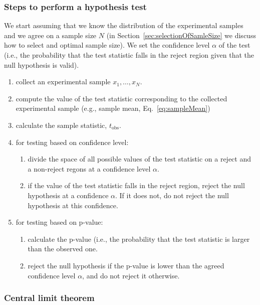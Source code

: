 \documentclass{beamer}
\begin{document}
\begin{frame}
\frametitle{Steps to perform a hypothesis test}

    We start assuming that we know the distribution of the experimental samples
    and we agree on a sample size $N$ (in
    Section~\ref{sec:selectionOfSamleSize} we discuss how to select and optimal
    sample size). We set the confidence level $\alpha$ of the test (i.e., the
    probability that the test statistic falls in the reject region given that
    the null hypothesis is valid).

    \begin{enumerate}

        \item collect an experimental sample $x_1,\ldots,x_N$.

        \item compute the value of the test statistic corresponding to the
    collected experimental sample (e.g., sample mean, Eq.~\ref{eq:sampleMean})

        \item calculate the sample statistic, $t_\text{obs}$.

        \item for testing based on confidence level:

            \begin{enumerate}[a]

                \item divide the space of all possible values of the test statistic
            on a reject and a non-reject regons at a confidence level $\alpha$.

                \item if the value of the test statistic falls in the reject
            region, reject the null hypothesis at a confidence $\alpha$. If it
            does not, do not reject the null hypothesis at this confidence.

            \end{enumerate}

        \item for testing based on p-value:

            \begin{enumerate}[a]

                \item calculate the p-value (i.e., the probability that the test
            statistic is larger than the observed one.

                \item reject the null hypothesis if the p-value is lower than the
            agreed confidence level $\alpha$, and do not reject it otherwise.

            \end{enumerate}

    \end{enumerate}

\end{frame}

\begin{frame}
\frametitle{Central limit theorem}

\end{frame}
\end{document}
